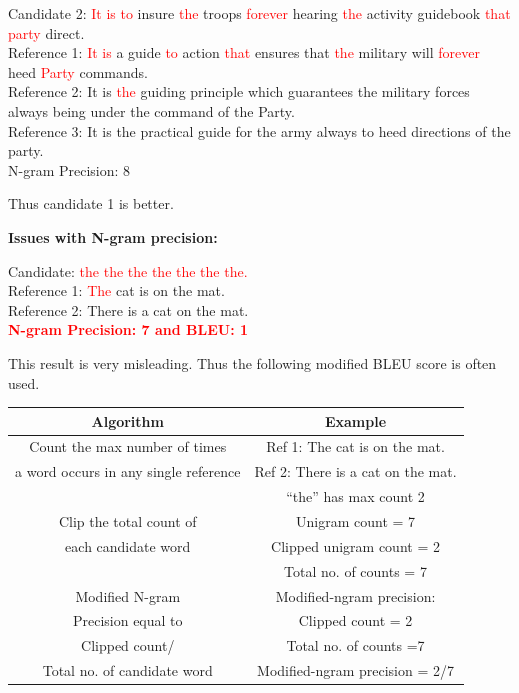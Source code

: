 \documentclass[a4paper]{article}
\newcommand{\red}[1]{\textcolor{red}{#1}}
\begin{document}
Candidate 2: \red{It is to} insure \red {the} troops \red {forever} hearing \red
{the} activity guidebook \red{that party} direct. \\
Reference 1: \red {It is} a guide \red {to} action \red {that} ensures that \red
{the} military will  \red{forever} heed \red{Party} commands. \\ Reference 2: It
is \red{the} guiding principle which guarantees the
military forces always being under the command of the Party. \\ Reference 3:  It
is the practical guide for the army always to heed directions of the party. \\
N-gram Precision: 8


Thus candidate 1 is better.


\textbf{Issues with N-gram precision:}


Candidate: \red{the the the the the the the.} \\
Reference 1: \red{The} cat is on the mat. \\
Reference 2: There is a cat on the mat. \\


\textbf{\red{N-gram Precision: 7 and BLEU: 1}}


This result is  very misleading. Thus the following modified BLEU score is often
used.


\begin{table}[h]
  \centering
  \begin{tabular}{|c|c|}
    \hline

    \textbf{Algorithm}  & \textbf{Example}  \\

    \hline

    Count the max number of times & Ref 1: The cat is on the mat.  \\
    a word occurs in any single reference & Ref 2: There is a cat on the mat. \\
    & “the” has max count 2 \\

    \hline

    Clip the total count of & Unigram count = 7 \\
    each candidate word & Clipped unigram count = 2 \\
    &Total no. of counts = 7 \\

    \hline

    Modified N-gram & Modified-ngram precision: \\
    Precision equal to & Clipped count = 2 \\
    Clipped count/ & Total no. of counts =7 \\
    Total no. of candidate word & Modified-ngram precision = 2/7\\

    \hline
  \end{tabular}
\end{table}
\end{document}
